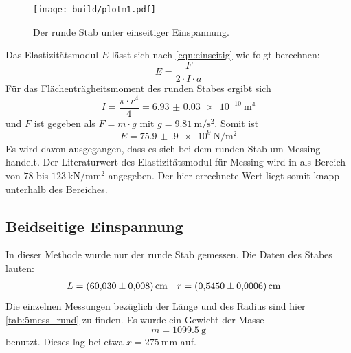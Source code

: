 \begin{figure}
  \centering
  \caption{Der runde Stab unter einseitiger Einspannung.}
  \texttt{[image: build/plotm1.pdf]}
  \label{fig:plot1m}
\end{figure}
Das Elastizitätsmodul $E$ lässt sich nach \eqref{eqn:einseitig}
wie folgt berechnen:
\begin{equation*}
  E = \frac{F}{2 \cdot I \cdot a}
\end{equation*}
Für das Flächenträgheitsmoment des runden Stabes ergibt sich
\begin{equation}\label{eqn:Trägheitsmoment_rund}
  I = \frac{\pi \cdot r^4}{4} = \SI{6.93(3)e-10}{\metre\tothe{4}}
\end{equation} 
und $F$ ist gegeben als $F = m \cdot g$ mit $g = \SI{9.81}{\metre\per\second\squared}$.
Somit ist 
\begin{equation*}
  E = \SI{75.9(9)e9}{\newton\per\metre\squared}
\end{equation*}
Es wird davon ausgegangen, dass es sich bei dem runden Stab um Messing handelt.
Der Literaturwert des Elastizitätsmodul für Messing wird in \cite{chemie.de} als Bereich von $\num{78}$ bis $\SI{123}{\kilo\newton\per\milli\metre\squared}$ angegeben.
Der hier errechnete Wert liegt somit knapp unterhalb des Bereiches.

\subsection{Beidseitige Einspannung}
In dieser Methode wurde nur der runde Stab gemessen. Die Daten des Stabes lauten:
\begin{align*}
  L &= \SI{60.03\pm 0.008}{\centi\metre} & r &= \SI{0.545\pm 0.0006}{\centi\metre}
\end{align*}
Die einzelnen Messungen bezüglich der Länge und des Radius sind hier \ref{tab:5mess_rund} zu finden. 
Es wurde ein Gewicht der Masse 
\begin{equation*}
  m = \SI{1099.5}{\gram}
\end{equation*}
benutzt. Dieses lag bei etwa $x = \SI{275}{\milli\metre}$ auf.

